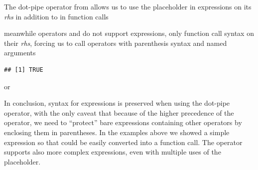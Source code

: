 \documentclass[krantz2]{krantz}\usepackage{knitr}
\begin{document}
The  dot-pipe operator  from  allows us to use the placeholder  in expressions on its \emph{rhs} in addition to in function calls

\begin{knitrout}\footnotesize
{}\color{fgcolor}
\end{knitrout}

meanwhile operators \Roperator{|>} and \Roperator{\%>\%} do not support expressions, only function call syntax on their \textit{rhs}, forcing us to call operators with parenthesis syntax and named arguments

\begin{knitrout}\footnotesize
{}\color{fgcolor}\begin{kframe}
\begin{alltt}
 \hlstd{(} \hlstd{= _,}  \hlstd{=} \hlstd{)} \hlkwb{->} 
\end{alltt}
\begin{verbatim}
## [1] TRUE
\end{verbatim}
\end{kframe}
\end{knitrout}

or

\begin{knitrout}\footnotesize
{}\color{fgcolor}
\end{knitrout}

In conclusion, \Rlang syntax for expressions is preserved when using the dot-pipe operator, with the only caveat that because of the higher precedence of the  operator, we need to ``protect'' bare expressions containing other operators by enclosing them in parentheses. In the examples above we showed a simple expression so that could be easily converted into a function call. The  operator supports also more complex expressions, even with multiple uses of the placeholder.
\end{document}
